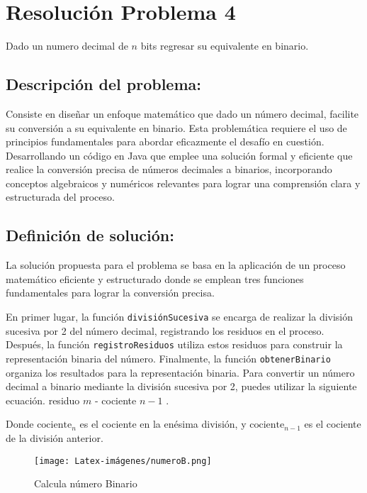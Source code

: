 \section{Resolución Problema 4}
Dado un numero decimal de $n$ bits regresar su equivalente en binario.


\subsection{\textbf{Descripción del problema:}}
Consiste en diseñar un enfoque matemático que dado un número decimal, facilite su conversión a su equivalente en binario. Esta problemática requiere el uso de principios fundamentales para abordar eficazmente el desafío en cuestión. Desarrollando un código en Java que emplee una solución formal y eficiente que realice la conversión precisa de números decimales a binarios, incorporando conceptos algebraicos y numéricos relevantes para lograr una comprensión clara y estructurada del proceso.


\subsection{\textbf{Definición de solución:}}
La solución propuesta para el problema se basa en la aplicación de un proceso matemático eficiente y estructurado donde se emplean tres funciones fundamentales para lograr la conversión precisa.

En primer lugar, la función \texttt{divisiónSucesiva} se encarga de realizar la división sucesiva por 2 del número decimal, registrando los residuos en el proceso. Después, la función \texttt{registroResiduos} utiliza estos residuos para construir la representación binaria del número. Finalmente, la función \texttt{obtenerBinario} organiza los resultados para la representación binaria.
Para convertir un número decimal a binario mediante la división sucesiva por 2, puedes utilizar la siguiente ecuación.
\ignorespaces
residuo $m$ - cociente $n-1$ .
    \label{eqn:rectaPendiente}

Donde $\text{cociente}_n$ es el cociente en la enésima división, y $\text{cociente}_{n-1}$ es el cociente de la división anterior. 

\begin{figure}[H]
    \centering
    \texttt{[image: Latex-imágenes/numeroB.png]}
    \caption{Calcula número Binario}
    \label{fig:Calcula número Binario}
\end{figure}


